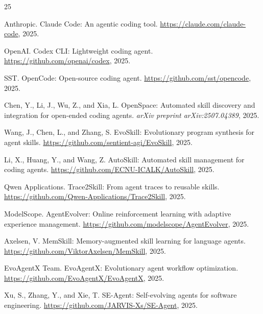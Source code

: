 \documentclass[11pt]{article}
\begin{document}


\begin{thebibliography}{25}

Anthropic.
\newblock Claude Code: An agentic coding tool.
\newblock \url{https://claude.com/claude-code}, 2025.

OpenAI.
\newblock Codex CLI: Lightweight coding agent.
\newblock \url{https://github.com/openai/codex}, 2025.

SST.
\newblock OpenCode: Open-source coding agent.
\newblock \url{https://github.com/sst/opencode}, 2025.

Chen, Y., Li, J., Wu, Z., and Xia, L.
\newblock OpenSpace: Automated skill discovery and integration for open-ended coding agents.
\newblock \emph{arXiv preprint arXiv:2507.04389}, 2025.

Wang, J., Chen, L., and Zhang, S.
\newblock EvoSkill: Evolutionary program synthesis for agent skills.
\newblock \url{https://github.com/sentient-agi/EvoSkill}, 2025.

Li, X., Huang, Y., and Wang, Z.
\newblock AutoSkill: Automated skill management for coding agents.
\newblock \url{https://github.com/ECNU-ICALK/AutoSkill}, 2025.

Qwen Applications.
\newblock Trace2Skill: From agent traces to reusable skills.
\newblock \url{https://github.com/Qwen-Applications/Trace2Skill}, 2025.

ModelScope.
\newblock AgentEvolver: Online reinforcement learning with adaptive experience management.
\newblock \url{https://github.com/modelscope/AgentEvolver}, 2025.

Axelsen, V.
\newblock MemSkill: Memory-augmented skill learning for language agents.
\newblock \url{https://github.com/ViktorAxelsen/MemSkill}, 2025.

EvoAgentX Team.
\newblock EvoAgentX: Evolutionary agent workflow optimization.
\newblock \url{https://github.com/EvoAgentX/EvoAgentX}, 2025.

Xu, S., Zhang, Y., and Xie, T.
\newblock SE-Agent: Self-evolving agents for software engineering.
\newblock \url{https://github.com/JARVIS-Xs/SE-Agent}, 2025.


\end{thebibliography}
\end{document}
